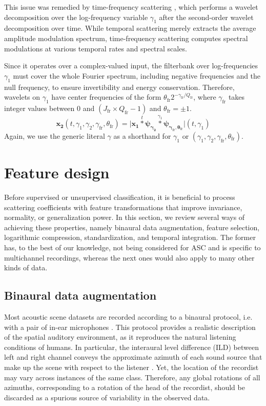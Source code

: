 \documentclass[journal]{IEEEtran}
\makeatletter
\newcommand*{\ie}{i.e.\@\xspace}
\makeatother
\begin{document}
This issue was remedied by time-frequency scattering \cite{Anden2015}, which performs a wavelet decomposition over the log-frequency variable $\gamma_1$ after the second-order wavelet decomposition over time.
While temporal scattering merely extracts the average amplitude modulation spectrum, time-frequency scattering computes spectral modulations at various temporal rates and spectral scales.

Since it operates over a complex-valued input, the filterbank over log-frequencies $\gamma_1$ must cover the whole Fourier spectrum, including negative frequencies and the null frequency, to ensure invertibility and energy conservation.
Therefore, wavelets on $\gamma_1$ have center frequencies of the form
$\theta_{\mathrm{fr}}  2^{-\gamma_{\mathrm{fr}}/Q_{\mathrm{fr}}}$, where $\gamma_{\mathrm{fr}}$ takes integer values between $0$ and $(J_\mathrm{fr} \times Q_\mathrm{fr} - 1)$ and $\theta_{\mathrm{fr}} = \pm 1$.
\begin{equation}
\boldsymbol{x_2}(t,\gamma_1,\gamma_2,\gamma_{\mathrm{fr}},\theta_{\mathrm{fr}}) =
\vert \boldsymbol{x_1}
\overset{t}{\ast} \boldsymbol{\psi_{\gamma_2}}
\overset{\gamma_1}{\ast} \boldsymbol{\psi_{\gamma_{\mathrm{fr}}, \theta_{\mathrm{fr}}}}
\vert (t,\gamma_1)
\end{equation}
Again, we use the generic literal $\gamma$ as a shorthand for $\gamma_1$ or $(\gamma_1, \gamma_2, \gamma_{\mathrm{fr}}, \theta_{\mathrm{fr}})$.

\section{Feature design}
Before supervised or unsupervised classification, it is beneficial to process scattering coefficients with feature transformations that improve invariance, normality, or generalization power. 
In this section, we review several ways of achieving these properties, namely binaural data augmentation, feature selection, logarithmic compression, standardization, and temporal integration.
The former has, to the best of our knowledge, not being considered for ASC and is specific to multichannel recordings, whereas the next ones would also apply to many other kinds of data.

\subsection{Binaural data augmentation}
Most acoustic scene datasets are recorded according to a binaural protocol, \ie with a pair of in-ear microphones \cite{Wang2006}.
This protocol provides a realistic description of the spatial auditory environment, as it reproduces the natural listening conditions of humans.
In particular, the interaural level difference (ILD) between left and right channel conveys the approximate azimuth of each sound source that make up the scene with respect to the listener \cite{Blauert2003}.
Yet, the location of the recordist may vary across instances of the same class.
Therefore, any global rotations of all azimuths, corresponding to a rotation of the head of the recordist, should be discarded as a spurious source of variability in the observed data.
\end{document}

